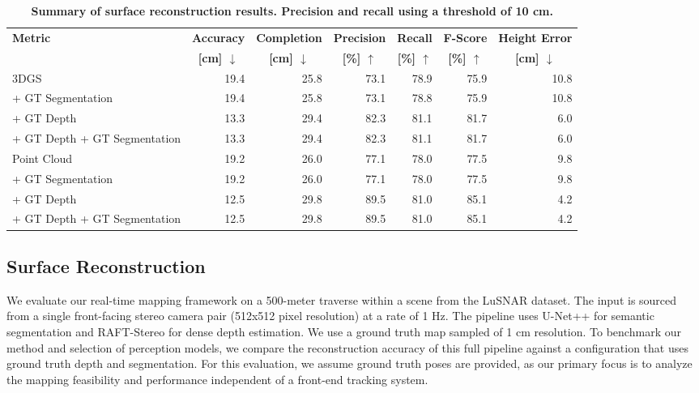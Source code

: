 \begin{table}[h]
	\centering
	\small
	\caption{\bfseries Summary of surface reconstruction results. Precision and recall using a threshold of 10 cm.}
	\label{tab:surface_reconstruction_short}
	\begin{tabular}[t]{|lrrrrrr|}
		\hline
		\multirow{2}{*}{\textbf{Metric}}               &
		\multicolumn{1}{c}{\textbf{Accuracy}}          &
		\multicolumn{1}{c}{\textbf{Completion}}        &
		\multicolumn{1}{c}{\textbf{Precision}}         &
		\multicolumn{1}{c}{\textbf{Recall}}            &
		\multicolumn{1}{c}{\textbf{F-Score}}           &
		\multicolumn{1}{c|}{\textbf{Height Error}}
		\\
		\multicolumn{1}{|c}{}                          &
		\multicolumn{1}{c}{\textbf{[cm] $\downarrow$}} &
		\multicolumn{1}{c}{\textbf{[cm] $\downarrow$}} &
		\multicolumn{1}{c}{\textbf{[\%] $\uparrow$}}   &
		\multicolumn{1}{c}{\textbf{[\%] $\uparrow$}}   &
		\multicolumn{1}{c}{\textbf{[\%] $\uparrow$}}   &
		\multicolumn{1}{c|}{\textbf{[cm] $\downarrow$}}                                          \\
		\hline\hline
		3DGS                                           & 19.4 & 25.8 & 73.1 & 78.9 & 75.9 & 10.8 \\
		+ GT Segmentation                              & 19.4 & 25.8 & 73.1 & 78.8 & 75.9 & 10.8 \\
		+ GT Depth                                     & 13.3 & 29.4 & 82.3 & 81.1 & 81.7 & 6.0  \\
		+ GT Depth + GT Segmentation                   & 13.3 & 29.4 & 82.3 & 81.1 & 81.7 & 6.0  \\
		\hline
		Point Cloud                                    & 19.2 & 26.0 & 77.1 & 78.0 & 77.5 & 9.8  \\
		+ GT Segmentation                              & 19.2 & 26.0 & 77.1 & 78.0 & 77.5 & 9.8  \\
		+ GT Depth                                     & 12.5 & 29.8 & 89.5 & 81.0 & 85.1 & 4.2  \\
		+ GT Depth + GT Segmentation                   & 12.5 & 29.8 & 89.5 & 81.0 & 85.1 & 4.2  \\
		\hline
	\end{tabular}
\end{table}

\subsection{Surface Reconstruction}
We evaluate our real-time mapping framework on a 500-meter traverse within a scene from the LuSNAR dataset. The input is sourced from a single front-facing stereo camera pair (512x512 pixel resolution) at a rate of 1 Hz. The pipeline uses U-Net++ for semantic segmentation and RAFT-Stereo for dense depth estimation.
We use a ground truth map sampled of 1 cm resolution.
To benchmark our method and selection of perception models, we compare the reconstruction accuracy of this full pipeline against a configuration that uses ground truth depth and segmentation. For this evaluation, we assume ground truth poses are provided, as our primary focus is to analyze the mapping feasibility and performance independent of a front-end tracking system.

